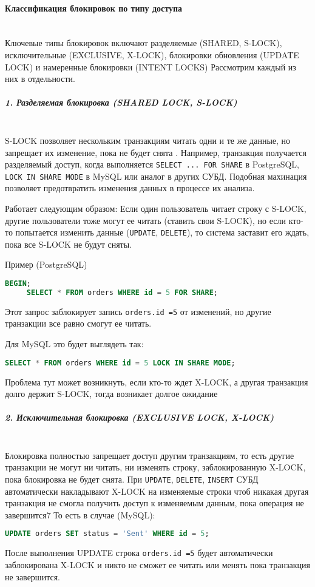  \paragraph{Классификация блокировок по типу доступа} ~\\
 
 Ключевые типы блокировок включают разделяемые (SHARED, S-LOCK), исключительные (EXCLUSIVE, X-LOCK), блокировки обновления (UPDATE LOCK) и намеренные блокировки (INTENT LOCKS)
 Рассмотрим каждый из них в отдельности.
 
 \subparagraph{1. Разделяемая блокировка (SHARED LOCK, S-LOCK)} ~\\
 S-LOCK позволяет нескольким транзакциям читать одни и те же данные, но запрещает их изменение, пока не будет снята \autocite{ElmasriNavathe}.
 Например, транзакция получается разделяемый доступ, когда выполняется \texttt{SELECT ... FOR SHARE} в PostgreSQL, \texttt{LOCK IN SHARE MODE} в MySQL или аналог в других СУБД.
 Подобная махинация позволяет предотвратить изменения данных в процессе их анализа.
 
 Работает следующим образом: 
 Если один пользователь читает строку с S-LOCK, другие пользователи тоже могут ее читать (ставить свои S-LOCK), но если кто-то попытается изменить данные (\texttt{UPDATE}, \texttt{DELETE}), то система заставит его ждать, пока все S-LOCK не будут сняты.
 
 Пример (PostgreSQL)
 \begin{lstlisting}[language=SQL]
     BEGIN;
     SELECT * FROM orders WHERE id = 5 FOR SHARE;    
 \end{lstlisting}
 Этот запрос заблокирует запись \texttt{orders.id =5} от изменений, но другие транзакции все равно смогут ее читать.
 
 Для MySQL это будет выглядеть так:
 \begin{lstlisting}[language=SQL]
     SELECT * FROM orders WHERE id = 5 LOCK IN SHARE MODE;  
 \end{lstlisting}
 
 Проблема тут может возникнуть, если кто-то ждет X-LOCK, а другая транзакция долго держит S-LOCK, тогда возникает долгое ожидание
 
 \subparagraph{2. Исключительная блокировка (EXCLUSIVE LOCK, X-LOCK)} ~\\
 
 Блокировка полностью запрещает доступ другим транзакциям, то есть другие транзакции не могут ни читать, ни изменять строку, заблокированную X-LOCK, пока блокировка не будет снята.
 При \texttt{UPDATE}, \texttt{DELETE}, \texttt{INSERT} СУБД автоматически накладывают X-LOCK на изменяемые строки чтоб никакая другая транзакция не смогла получить доступ к изменяемым данным, пока операция не завершится7
 То есть в случае (MySQL):
 \begin{lstlisting}[language=SQL]
     UPDATE orders SET status = 'Sent' WHERE id = 5; 
 \end{lstlisting}
 После выполнения UPDATE строка \texttt{orders.id =5} будет автоматически заблокирована X-LOCK и никто не сможет ее читать или менять пока транзакция не завершится.
 
